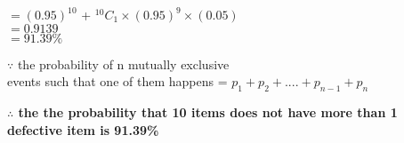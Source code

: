 \documentclass[12pt]{article}
\begin{document}
\hspace*{3.5in}  $= (0.95)^{10}$ + $^{10}C_1 \times (0.95)^9 \times (0.05)$    \\
\hspace*{3.5in} $=0.9139$\\
\hspace*{3.5in} $=91.39 \%$
\begin{flushright}
$\because$ the probability of n mutually exclusive \hspace*{1.9in} \\events such that one of them happens = $p_1 + p_2 + ....+ p_{n-1} + p_n$
\end{flushright}
\textbf{$\therefore$ the the probability that 10 items does not have more than 1 defective item is 91.39\%}
\end{document}
